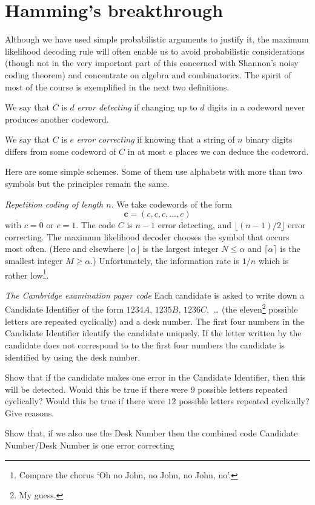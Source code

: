 \section{Hamming's breakthrough}
Although we have used simple probabilistic arguments
to justify it, the maximum likelihood decoding rule
will often enable us to avoid probabilistic considerations
(though not in the very important part of this concerned with
Shannon's noisy coding theorem) and concentrate on
algebra and combinatorics.
The spirit of most of the course is exemplified in the
next two definitions.
\begin{definition} We say that $C$ is $d$ \emph{error detecting}
if changing up to $d$ digits in a codeword never produces
another codeword.
\end{definition}
\begin{definition} We say that $C$ is $e$
\emph{error correcting}
if knowing that a string of $n$ binary digits differs
from some codeword of $C$ in at most
$e$ places we can deduce the codeword.
\end{definition}

Here are some simple schemes. Some of them use alphabets with
more than two symbols but the principles remain the same.

\noindent\emph{Repetition coding of length $n$}.
We take codewords of the form
\[{\mathbf c}=(c,c,c,\dots,c)\]
with $c=0$ or $c=1$. The code $C$ is $n-1$ error detecting,
and $\lfloor (n-1)/2\rfloor$ error correcting.
The maximum likelihood decoder chooses the
symbol that occurs most often.
(Here and elsewhere $\lfloor \alpha\rfloor$ is the largest
integer $N\leq\alpha$ and $\lceil \alpha \rceil$ is
the smallest integer $M\geq\alpha$.) Unfortunately,
the information rate is $1/n$ which is
rather low\footnote{Compare
the chorus `Oh no John, no John, no John, no'.}.

\noindent\emph{The Cambridge examination paper code}
Each candidate is asked to write down a Candidate Identifier of the
form 
$1234A$, $1235B$, $1236C$,\ \dots 
(the eleven\footnote{My guess.} possible letters are repeated cyclically)
and a desk number. The first four numbers
in the Candidate Identifier  identify the candidate
uniquely. If the letter written by the
candidate does not correspond to
to the first four numbers the candidate is identified
by using the desk number.
\begin{exercise}\label{E;Cambridge exam} 
Show that if the candidate makes one error
in the Candidate Identifier,
then this will be detected.
Would this be true if there were $9$ possible
letters repeated cyclically? Would this be true
if there were $12$ possible
letters repeated cyclically?
Give reasons.

Show that, if we also use the Desk Number
then the combined code Candidate Number/Desk Number 
is one error correcting
\end{exercise}

